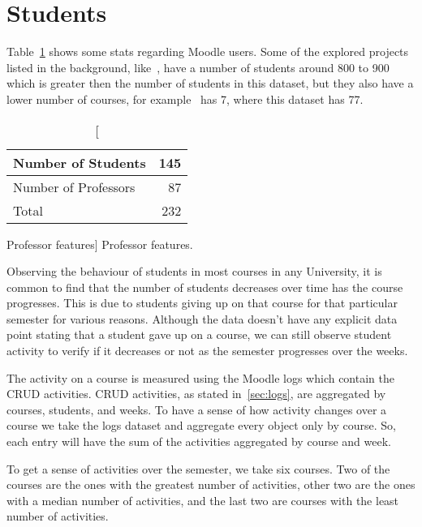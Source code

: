 \section{Students}

Table~\ref{tab:moodle_users_stats} shows some stats regarding Moodle users.
Some of the explored projects listed in the background, like~, have
a number of students around 800 to 900 which is greater then the number of
students in this dataset, but they also have a lower number of courses, for
example~ has 7, where this dataset has 77.

\begin{table}[h!]
    \centering

    \begin{tabular}{| l | r |}
        \hline
        Number of Students   & 145 \\ \hline
        Number of Professors & 87  \\ \hline
        Total                & 232 \\ \hline
    \end{tabular}

    \caption
        [Professor features]
        {Professor features.}

    \label{tab:moodle_users_stats}
\end{table}

Observing the behaviour of students in most courses in any University, it is
common to find that the number of students decreases over time has the course
progresses. This is due to students giving up on that course for that
particular semester for various reasons. Although the data doesn't have any
explicit data point stating that a student gave up on a course, we can still
observe student activity to verify if it decreases or not as the semester
progresses over the weeks.

The activity on a course is measured using the Moodle logs which contain the
CRUD activities. CRUD activities, as stated in~\ref{sec:logs}, are aggregated
by courses, students, and weeks. To have a sense of how activity changes over a
course we take the logs dataset and aggregate every object only by course. So,
each entry will have the sum of the activities aggregated by course and week.

To get a sense of activities over the semester, we take six courses. Two of the courses are the ones with the greatest number of activities, other two are the ones with a median number of activities, and the last two are courses with the least number of activities.

